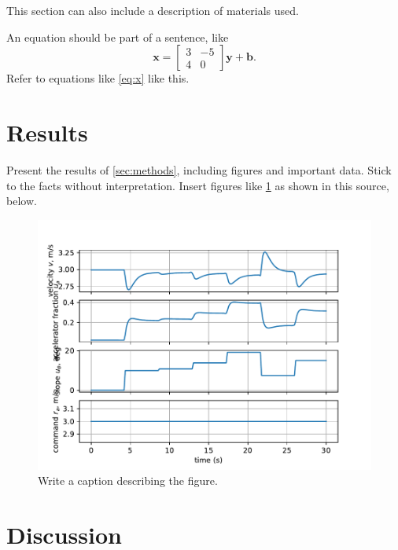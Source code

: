 \documentclass[letterpaper]{article}
\begin{document}
This section can also include a description of materials used.

An equation should be part of a sentence, like
\begin{equation} \label{eq:x}
\bm{x} = \begin{bmatrix}
3 & -5 \\
4 & 0
\end{bmatrix}
\bm{y} +
\bm{b}.
\end{equation}
Refer to equations like \cref{eq:x} like this.

\lipsum[6]

\section{Results}
\label{sec:results}

Present the results of \cref{sec:methods}, including figures and important data. Stick to the facts without interpretation. Insert figures like \cref{fig:expert} as shown in this source, below.

\begin{figure}[htbp]
\centering
\includegraphics[width=1\linewidth]{figures/expert-0035.pdf}
\caption{Write a caption describing the figure.}
\label{fig:expert}
\end{figure}

\lipsum[5]

\section{Discussion}
\label{sec:discussion}
\end{document}
